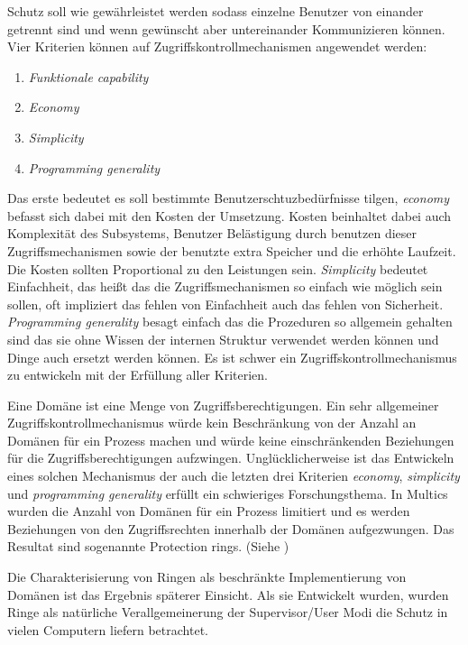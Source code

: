 \documentclass[11pt,technote]{IEEEtran}
\begin{document}
        Schutz soll wie gew\"ahrleistet werden sodass einzelne Benutzer von einander getrennt sind und wenn gew\"unscht aber untereinander Kommunizieren k\"onnen.
        Vier Kriterien k\"onnen auf Zugriffskontrollmechanismen angewendet werden: 
        \begin{enumerate}
          \item \textit{Funktionale capability}
          \item \textit{Economy}
          \item \textit{Simplicity}
          \item \textit{Programming generality}
        \end{enumerate}
        Das erste bedeutet es soll bestimmte Benutzerschtuzbed\"urfnisse tilgen, \textit{economy} befasst sich dabei mit den Kosten der Umsetzung.
        Kosten beinhaltet dabei auch Komplexit\"at des Subsystems, Benutzer Bel\"astigung durch benutzen dieser Zugriffsmechanismen sowie der benutzte
        extra Speicher und die erh\"ohte Laufzeit. Die Kosten sollten Proportional zu den Leistungen sein.
        \textit{Simplicity} bedeutet Einfachheit, das hei\ss t das die Zugriffsmechanismen so einfach wie m\"oglich sein sollen, oft
        impliziert das fehlen von Einfachheit auch das fehlen von Sicherheit. \textit{Programming generality} besagt einfach das die Prozeduren so allgemein gehalten sind
        das sie ohne Wissen der internen Struktur verwendet werden k\"onnen und Dinge auch ersetzt werden k\"onnen.
        Es ist schwer ein Zugriffskontrollmechanismus zu entwickeln mit der Erf\"ullung aller Kriterien.
     
        Eine Dom\"ane ist eine Menge von Zugriffsberechtigungen. Ein sehr allgemeiner Zugriffskontrollmechanismus w\"urde kein Beschr\"ankung von der Anzahl an
        Dom\"anen f\"ur ein Prozess machen und w\"urde keine einschr\"ankenden Beziehungen f\"ur die Zugriffsberechtigungen aufzwingen.
        Ungl\"ucklicherweise ist das Entwickeln eines solchen Mechanismus der auch die letzten drei Kriterien \textit{economy}, \textit{simplicity} und \textit{programming generality}
        erf\"ullt ein schwieriges Forschungsthema.  In Multics wurden die Anzahl von Dom\"anen f\"ur ein Prozess limitiert und es werden Beziehungen von den Zugriffsrechten innerhalb
        der Dom\"anen aufgezwungen. Das Resultat sind sogenannte Protection rings. (Siehe \cite[S. 160]{inproc:protec-rings}) 
        
        Die Charakterisierung von Ringen als beschr\"ankte Implementierung von Dom\"anen ist das Ergebnis sp\"aterer Einsicht. 
        Als sie Entwickelt wurden, wurden Ringe als nat\"urliche Verallgemeinerung der Supervisor/User Modi die Schutz in vielen Computern liefern betrachtet.
    
\end{document}

